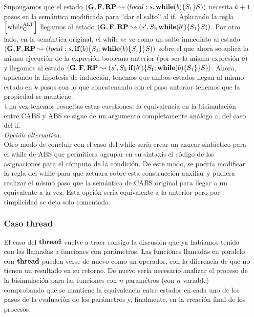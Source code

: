 Supongamos que el estado $(\mathbf{G}, \mathbf{F}, \textbf{RP} \leadsto (local:s, \mbox{\textbf{while}} (b) \{S_1\}S))$ necesita $k+1$ pasos en la semántica modificada para ``dar el salto'' al if. Aplicando la regla $\left[ \text{while}_{\text{C}}^{\text{ALT}} \right]$ llegamos al estado $(\mathbf{G}, \mathbf{F}, \textbf{RP} \leadsto (s', S_{\mathbb{B}}\,\mbox{\textbf{while}} (b') \{S_1\}S))$. Por otro lado, en la semántica original, el while se ve como un salto inmediato al estado $(\mathbf{G}, \mathbf{F}, \textbf{RP} \leadsto (local:s, \mbox{\textbf{if}} (b) \{S_1\mbox{;\,}\mbox{\textbf{while}} (b) \{S_1\}\}S))$ sobre el que ahora se aplica la misma ejecución de la expresión booleana anterior (por ser la misma expresión $b$) y llegamos al estado $(\mathbf{G}, \mathbf{F}, \textbf{RP} \leadsto (s', S_{\mathbb{B}}\,\mbox{\textbf{if}} (b') \{S_1\mbox{;\,}\mbox{\textbf{while}} (b) \{S_1\}\}S))$. Ahora, aplicando la hipótesis de inducción, tenemos que ambos estados llegan al mismo estado en $k$ pasos con lo que concatenando con el paso anterior tenemos que la propiedad se mantiene.\\

Una vez tenemos resueltas estas cuestiones, la equivalencia en la bisimulación entre CABS y ABS se sigue de un argumento completamente análogo al del caso del if.\\

\textit{Opción alternativa.}\\

Otro modo de concluir con el caso del while sería crear un azucar sintáctico para el while de ABS que permitiera agrupar en su sintaxis el código de las asignaciones para el cómputo de la condición. De este modo, se podría modificar la regla del while para que actuara sobre esta construcción auxiliar y pudiera realizar el mismo paso que la semántica de CABS original para llegar a un equivalente a la vez. Esta opción sería equivalente a la anterior pero por simplicidad se deja solo comentada.

\subsubsection{Caso thread}

El caso del $\textbf{thread}$ vuelve a traer consigo la discusión que ya habíamos tenido con las llamadas a funciones con parámetros. Las funciones llamadas en paralelo con $\textbf{thread}$ pueden verse de nuevo como un operador, con la diferencia de que no tienen un resultado en su retorno. De nuevo sería necesario analizar el proceso de la bisimulación para las funciones con $n$-paramétros (con $n$ variable) comprobando que se mantiene la equivalencia entre estados en cada uno de los pasos de la evaluación de los parámetros y, finalmente, en la creación final de los procesos.\\

